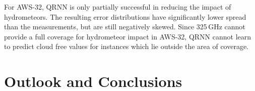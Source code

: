 \documentclass[amt, manuscript]{copernicus}
\begin{document}
For AWS-32, QRNN is only partially successful in reducing the impact of hydrometeors. The resulting error distributions have significantly lower spread than the measurements, but are still negatively skewed. Since 325\,GHz cannot provide a full coverage for hydrometeor impact in AWS-32, QRNN cannot learn to predict cloud free values for instances which lie outside the area of coverage. 



\section{Outlook and Conclusions}  %













\appendix
\section{}    %

\subsection{}     %
\end{document}
